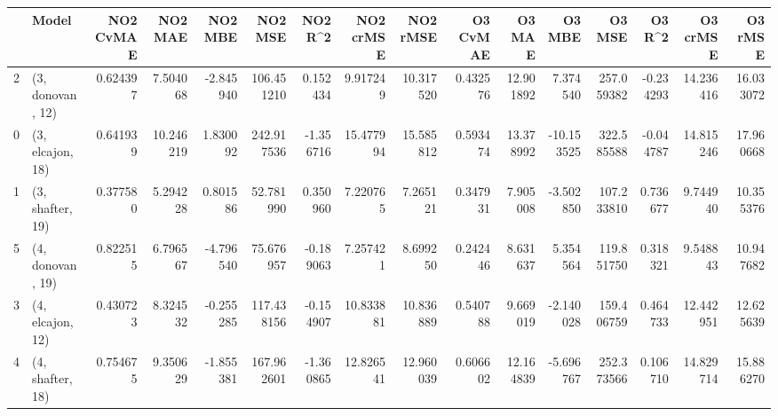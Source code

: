 \begin{tabular}{llrrrrrrrrrrrrrr}
\toprule
{} &             Model &  NO2 CvMAE &    NO2 MAE &   NO2 MBE &     NO2 MSE &   NO2 R\textasciicircum2 &  NO2 crMSE &   NO2 rMSE &  O3 CvMAE &     O3 MAE &     O3 MBE &      O3 MSE &    O3 R\textasciicircum2 &   O3 crMSE &    O3 rMSE \\
\midrule
2 &  (3, donovan, 12) &   0.624397 &   7.504068 & -2.845940 &  106.451210 &  0.152434 &   9.917249 &  10.317520 &  0.432576 &  12.901892 &   7.374540 &  257.059382 & -0.234293 &  14.236416 &  16.033072 \\
0 &  (3, elcajon, 18) &   0.641939 &  10.246219 &  1.830092 &  242.917536 & -1.356716 &  15.477994 &  15.585812 &  0.593474 &  13.378992 & -10.153525 &  322.585588 & -0.044787 &  14.815246 &  17.960668 \\
1 &  (3, shafter, 19) &   0.377580 &   5.294228 &  0.801586 &   52.781990 &  0.350960 &   7.220765 &   7.265121 &  0.347931 &   7.905008 &  -3.502850 &  107.233810 &  0.736677 &   9.744940 &  10.355376 \\
5 &  (4, donovan, 19) &   0.822515 &   6.796567 & -4.796540 &   75.676957 & -0.189063 &   7.257421 &   8.699250 &  0.242446 &   8.631637 &   5.354564 &  119.851750 &  0.318321 &   9.548843 &  10.947682 \\
3 &  (4, elcajon, 12) &   0.430723 &   8.324532 & -0.255285 &  117.438156 & -0.154907 &  10.833881 &  10.836889 &  0.540788 &   9.669019 &  -2.140028 &  159.406759 &  0.464733 &  12.442951 &  12.625639 \\
4 &  (4, shafter, 18) &   0.754675 &   9.350629 & -1.855381 &  167.962601 & -1.360865 &  12.826541 &  12.960039 &  0.606602 &  12.164839 &  -5.696767 &  252.373566 &  0.106710 &  14.829714 &  15.886270 \\
\bottomrule
\end{tabular}
